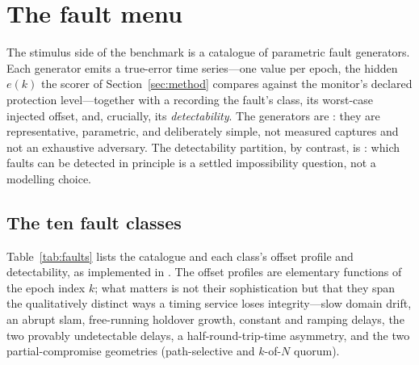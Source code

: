 \section{The fault menu}
\label{sec:faultmenu}

The stimulus side of the benchmark is a catalogue of parametric fault generators.
Each generator emits a true-error time series---one value per epoch, the hidden
$e(k)$ the scorer of Section~\ref{sec:method} compares against the monitor's
declared protection level---together with a  recording the fault's
class, its worst-case injected offset, and, crucially, its \emph{detectability}.
The generators are \Modelled{}: they are representative, parametric, and
deliberately simple, not measured captures and not an exhaustive adversary. The
detectability partition, by contrast, is \Cited{}: which faults can be detected in
principle is a settled impossibility question, not a modelling choice.

\subsection{The ten fault classes}
\label{sec:classes}

Table~\ref{tab:faults} lists the catalogue and each class's offset profile and
detectability, as implemented in . The offset
profiles are elementary functions of the epoch index $k$; what matters is not their
sophistication but that they span the qualitatively distinct ways a timing service
loses integrity---slow domain drift, an abrupt slam, free-running holdover growth,
constant and ramping delays, the two provably undetectable delays, a
half-round-trip-time asymmetry, and the two partial-compromise geometries
(path-selective and $k$-of-$N$ quorum).

